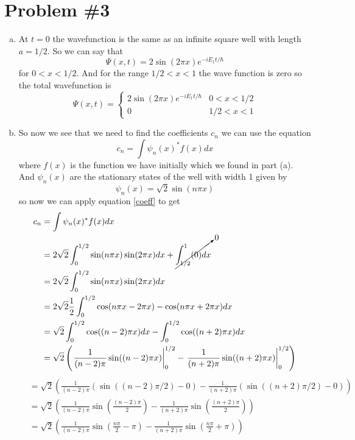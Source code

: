 \documentclass[11pt]{article}
\numberwithin{equation}{section}
\begin{document}
\section{Problem \#3}
\begin{enumerate}[(a)]
\item
At $t=0$ the wavefunction is the same as an infinite square well with length $a=1/2$. So we can say that
$$\Psi(x,t) = 2\sin\left(2\pi x\right)e^{-iE_1t/\hbar}$$
for $0<x<1/2$. And for the range $1/2<x<1$ the wave function is zero so the total wavefunction is
$$\Psi(x,t) = \left\{\begin{array}{cc}
	2\sin\left(2\pi x\right)e^{-iE_1t/\hbar}	&0<x<1/2\\
	0						&1/2<x<1
	\end{array}\right.$$

\item
So now we see that we need to find the coefficients $c_n$ we can use the equation
\begin{equation}
c_n = \int\psi_n(x)^*f(x)dx
\label{coeff}
\end{equation}
where $f(x)$ is the function we have initially which we found in part (a). And $\psi_n(x)$ are the stationary states of the well with width 1 given by
$$\psi_n(x) = \sqrt{2}\sin(n\pi x)$$
so now we can apply equation \ref{coeff} to get
\begin{align*}
c_n &= \int\psi_n(x)^*f(x)dx\\
&= 2\sqrt{2}\int_0^{1/2}\sin(n\pi x)\sin(2\pi x)dx + \cancelto{0}{\int_{1/2}^1(0)dx}\\
&= 2\sqrt{2}\int_0^{1/2}\sin(n\pi x)\sin(2\pi x)dx\\
&= 2\sqrt{2}\frac{1}{2}\int_0^{1/2}\cos(n\pi x-2\pi x)-\cos(n\pi x + 2\pi x)dx\\
&= \sqrt{2}\int_0^{1/2}\cos((n-2)\pi x)dx-\int_{0}^{1/2}\cos((n+2)\pi x)dx\\
&= \sqrt{2}\left(\left.\frac{1}{(n-2)\pi}\sin((n-2)\pi x)\right|_0^{1/2} - \left.\frac{1}{(n+2)\pi}\sin((n+2)\pi x)\right|_0^{1/2}\right)
\end{align*}
\begin{align*}
&= \sqrt{2}\left(\frac{1}{(n-2)\pi}\left(\sin((n-2)\pi/2)-0\right) - \frac{1}{(n+2)\pi}\left(\sin((n+2)\pi/2)-0\right)\right)\\
&= \sqrt{2}\left(\frac{1}{(n-2)\pi}\sin\left(\frac{(n-2)\pi}{2}\right) - \frac{1}{(n+2)\pi}\sin\left(\frac{(n+2)\pi}{2}\right)\right)\\
&= \sqrt{2}\left(\frac{1}{(n-2)\pi}\sin\left(\frac{n\pi}{2}-\pi\right) - \frac{1}{(n+2)\pi}\sin\left(\frac{n\pi}{2}+\pi\right)\right)\\

\end{align*}
\end{enumerate}
\end{document}
